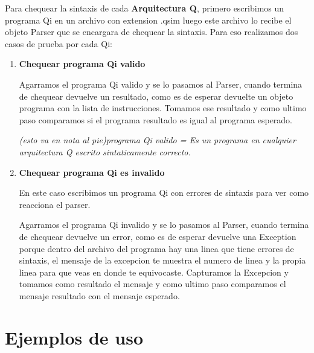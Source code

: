 Para chequear la sintaxis de cada \textbf{Arquitectura Q}, primero escribimos un programa Qi en un archivo con extension .qsim luego este archivo lo recibe el objeto Parser que se encargara de chequear la sintaxis. 
Para eso realizamos dos casos de prueba por cada Qi:
\begin{enumerate}
\item \textbf{Chequear programa Qi valido}

Agarramos el programa Qi valido y se lo pasamos al Parser, cuando termina de chequear devuelve un resultado, como es de esperar devuelte un objeto programa con la lista de instrucciones. Tomamos ese resultado y como ultimo paso comparamos si el programa resultado es igual al programa esperado.

\textit{ (esto va en nota al pie)programa Qi valido = Es un programa en cualquier arquitectura Q escrito sintaticamente correcto.}

\item \textbf{Chequear programa Qi es invalido} 

En este caso escribimos un programa Qi con errores de sintaxis para ver como reacciona el parser.

Agarramos el programa Qi invalido y se lo pasamos al Parser, cuando termina de chequear devuelve un error, como es de esperar devuelve una Exception porque dentro del archivo del programa hay una linea que tiene errores de sintaxis, el mensaje de la excepcion te muestra el numero de linea y la propia linea para que veas en donde te equivocaste. Capturamos la Excepcion y tomamos como resultado el mensaje y como ultimo paso comparamos el mensaje resultado con el mensaje esperado.
\end{enumerate}
\section{Ejemplos de uso}
